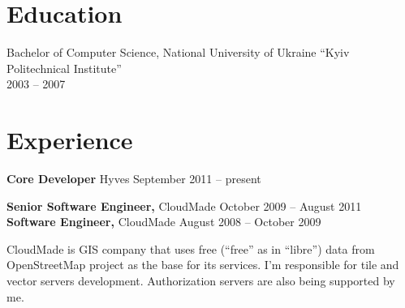 \documentclass[margin]{res}
\begin{document}

\address{{\bf Address} \\ Mercatorplein 36-K \\ 1056CL, Amsterdam, The Netherlands}

\address{{\bf Contacts} \\ +31 (62) 980-61-41 \\ contact@mishkovskyi.net \\ skype: andriy.mishkovskyy \\ \href{http://mishkovskyi.net}{mishkovskyi.net}}

\begin{resume}


\section{Education}
Bachelor of Computer Science, National University of Ukraine ``Kyiv Politechnical Institute'' \\
2003 -- 2007

\section{Experience}

{\bf Core Developer} Hyves \hfill September 2011 -- present

{\bf Senior Software Engineer,} CloudMade \hfill October 2009 -- August 2011\\
{\bf Software Engineer,} CloudMade \hfill August 2008 -- October 2009

CloudMade is GIS company that uses free
(``free'' as in ``libre'') data from OpenStreetMap project as
the base for its services. I'm responsible for tile and
vector servers development. Authorization servers are also
being supported by me.\\


\end{resume}
\end{document}
